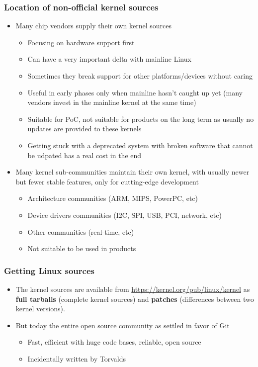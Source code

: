 \begin{frame}
  \frametitle{Location of non-official kernel sources}
  \begin{itemize}
  \item Many chip vendors supply their own kernel sources
    \begin{itemize}
    \item Focusing on hardware support first
    \item Can have a very important delta with mainline Linux
    \item Sometimes they break support for other platforms/devices
      without caring
    \item Useful in early phases only when mainline hasn't caught up yet
      (many vendors invest in the mainline kernel at the same time)
    \item Suitable for PoC, not suitable for products on the long term
      as usually no updates are provided to these kernels
    \item Getting stuck with a deprecated system with broken software
      that cannot be udpated has a real cost in the end
    \end{itemize}
  \item Many kernel sub-communities maintain their own kernel, with
    usually newer but fewer stable features, only for cutting-edge
    development
    \begin{itemize}
    \item Architecture communities (ARM, MIPS, PowerPC, etc)
    \item Device drivers communities (I2C, SPI, USB, PCI, network, etc)
    \item Other communities (real-time, etc)
    \item Not suitable to be used in products
    \end{itemize}
  \end{itemize}
\end{frame}

\begin{frame}
  \frametitle{Getting Linux sources}
  \begin{itemize}
  \item The kernel sources are available from
    \url{https://kernel.org/pub/linux/kernel} as {\bf full tarballs}
    (complete kernel sources) and {\bf patches} (differences between
    two kernel versions).
  \item But today the entire open source community as settled in favor
    of Git
    \begin{itemize}
    \item Fast, efficient with huge code bases, reliable, open source
    \item Incidentally written by Torvalds
    \end{itemize}
  \end{itemize}
\end{frame}

